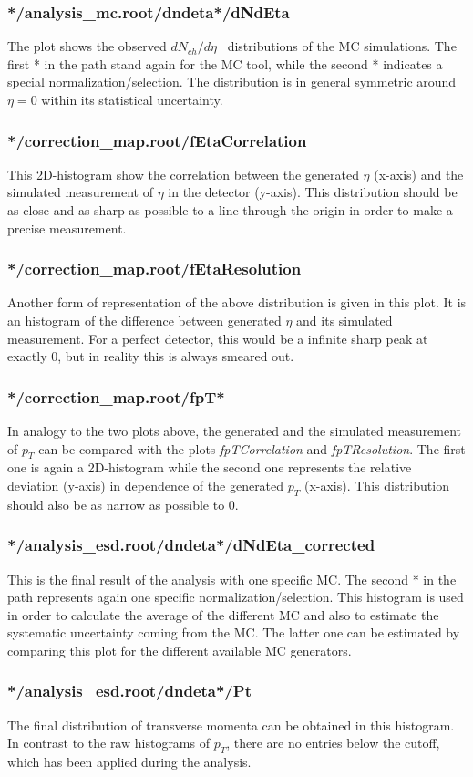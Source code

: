 \documentclass{article}
\newcommand\dNdEta{$dN_{ch}/d\eta$}
\begin{document}
\subsubsection*{*/analysis\_mc.root/dndeta*/dNdEta}
The plot shows the observed \dNdEta~ distributions of the MC simulations. The first * in the path stand again for the MC tool, while the second * indicates a special normalization/selection. The distribution is in general symmetric around $\eta = 0$ within its statistical uncertainty.
\subsubsection*{*/correction\_map.root/fEtaCorrelation}
This 2D-histogram show the correlation between the generated $\eta$ (x-axis) and the simulated measurement of $\eta$ in the detector (y-axis). This distribution should be as close and as sharp as possible to a line through the origin in order to make a precise measurement.
\subsubsection*{*/correction\_map.root/fEtaResolution}
Another form of representation of the above distribution is given in this plot. It is an histogram of the difference between generated $\eta$ and its simulated measurement. For a perfect detector, this would be a infinite sharp peak at exactly $0$, but in reality this is always smeared out.
\subsubsection*{*/correction\_map.root/fpT*}
In analogy to the two plots above, the generated and the simulated measurement of $p_{T}$ can be compared with the plots \textit{fpTCorrelation} and \textit{fpTResolution}. The first one is again a 2D-histogram while the second one represents the relative deviation (y-axis) in dependence of the generated $p_{T}$ (x-axis). This distribution should also be as narrow as possible to $0$.
\subsubsection*{*/analysis\_esd.root/dndeta*/dNdEta\_corrected}
This is the final result of the analysis with one specific MC. The second * in the path represents again one specific normalization/selection. This histogram is used in order to calculate the average of the different MC and also to estimate the systematic uncertainty coming from the MC. The latter one can be estimated by comparing this plot for the different available MC generators.
\subsubsection*{*/analysis\_esd.root/dndeta*/Pt}
The final distribution of transverse momenta can be obtained in this histogram. In contrast to the raw histograms of $p_{T}$, there are no entries below the cutoff, which has been applied during the analysis.
\end{document}
